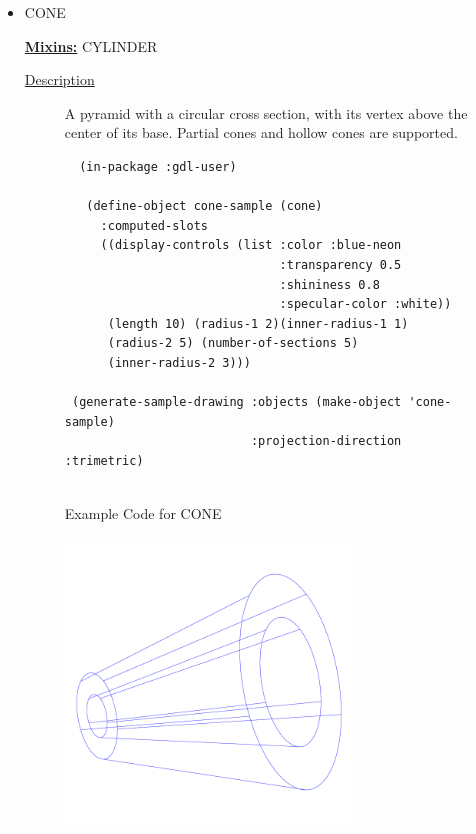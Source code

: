 \documentclass [11pt]{book}
\begin{document}
\begin{itemize}
\item {}CONE


\textbf{
\underline{Mixins:}} CYLINDER





\begin{description}

\item [
\underline{Description}]


A pyramid with a circular cross section, with its vertex above 
the center of its base. Partial cones and hollow cones are supported.



\end{description}




\begin{figure}
\begin{lrbox}{\boxedverb}
\begin{minipage}{\linewidth}
{\small

\begin{verbatim}
  (in-package :gdl-user)

   (define-object cone-sample (cone)
     :computed-slots
     ((display-controls (list :color :blue-neon 
                              :transparency 0.5 
                              :shininess 0.8 
                              :specular-color :white))
      (length 10) (radius-1 2)(inner-radius-1 1)
      (radius-2 5) (number-of-sections 5)
      (inner-radius-2 3)))
  
 (generate-sample-drawing :objects (make-object 'cone-sample) 
                          :projection-direction :trimetric) 
  
\end{verbatim}}
\end{minipage}
\end{lrbox}
\fbox{\usebox{\boxedverb}}

\caption{Example Code for CONE}

\label{fig:example-code-CONE}

\end{figure}

\begin{figure}
\begin{center}
\includegraphics[width=3in,height=3in]{../images/example-CONE.pdf}
\end{center}


\end{figure}
\end{itemize}
\end{document}

